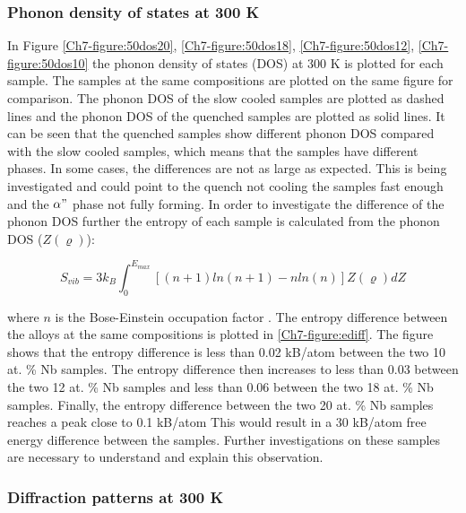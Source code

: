 \subsubsection{Phonon density of states at 300 K}

In Figure \ref{Ch7-figure:50dos20}, \ref{Ch7-figure:50dos18}, \ref{Ch7-figure:50dos12}, \ref{Ch7-figure:50dos10} the phonon density of states (DOS) at 300 K is plotted for each sample. The samples at the same compositions are plotted on the same figure for comparison. The phonon DOS of the slow cooled samples are plotted as dashed lines and the phonon DOS of the quenched samples are plotted as solid lines. It can be seen that the quenched samples show different phonon DOS compared with the slow cooled samples, which means that the samples have different phases. In some cases, the differences are not as large as expected. This is being investigated and could point to the quench not cooling the samples fast enough and the $\alpha"$ phase not fully forming. In order to investigate the difference of the phonon DOS further the entropy of each sample is calculated from the phonon DOS ($Z(\varrho)$):

\begin{equation}
\label{eq:phononentropy}
S_{vib} = 3 k_{B} \int_{0}^{E_{max}} \left[ \left( n+1 \right) ln\left(n+1\right) -n ln\left(n\right) \right] Z(\varrho) dZ
\end{equation}

\noindent where $n$ is the Bose-Einstein occupation factor \cite{Budai2014}. The entropy difference between the alloys at the same compositions is plotted in \ref{Ch7-figure:ediff}. The figure shows that the entropy difference is less than 0.02 kB/atom between the two 10 at. \% Nb samples. The entropy difference then increases to less than 0.03 between the two 12 at. \% Nb samples and less than 0.06 between the two 18 at. \% Nb samples. Finally, the entropy difference between the two 20 at. \% Nb samples reaches a peak close to 0.1 kB/atom This would result in a 30 kB/atom free energy difference between the samples. Further investigations on these samples are necessary to understand and explain this observation.

\subsubsection{Diffraction patterns at 300 K}

